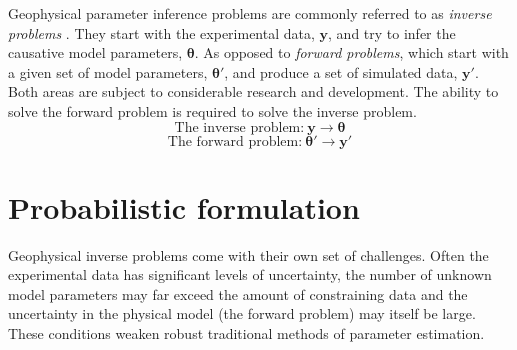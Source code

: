 Geophysical parameter inference problems are commonly referred to as \textit{inverse problems} \citep{Tarantola2005,Aster2013,Menke2012}. They start with the experimental data, $\bm{y}$, and try to infer the causative model parameters, $\bm{\theta}$. As opposed to \textit{forward problems}, which start with a given set of model parameters, $\bm{\theta'}$, and produce a set of simulated data, $\bm{y'}$. Both areas are subject to considerable research and development. The ability to solve the forward problem is required to solve the inverse problem.
\begin{equation}
\text{The inverse problem:}\ \bm{y} \rightarrow \bm{\theta}
\label{inverse_problem}
\end{equation}
\begin{equation}
\text{The forward problem:}\ \bm{\theta'} \rightarrow \bm{y'}
\label{forward_problem}
\end{equation}


\section{Probabilistic formulation}

Geophysical inverse problems come with their own set of challenges. Often the experimental data has significant levels of uncertainty, the number of unknown model parameters may far exceed the amount of constraining data and the uncertainty in the physical model (the forward problem) may itself be large. These conditions weaken robust traditional methods of parameter estimation.\par

